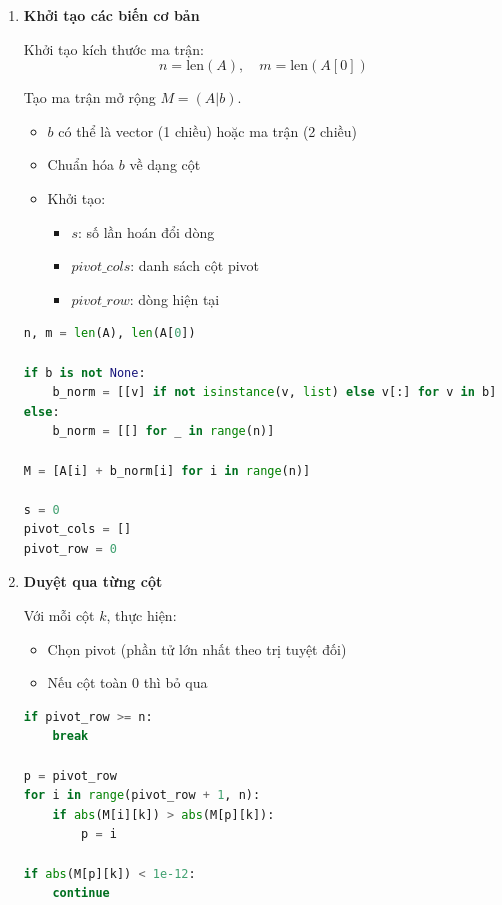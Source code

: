 \documentclass[a4paper,12pt]{report}
\begin{document}
\begin{enumerate}

\item \textbf{Khởi tạo các biến cơ bản}

Khởi tạo kích thước ma trận:
\[
n = \text{len}(A), \quad m = \text{len}(A[0])
\]

Tạo ma trận mở rộng $M = (A|b)$.

\begin{itemize}
    \item $b$ có thể là vector (1 chiều) hoặc ma trận (2 chiều)
    \item Chuẩn hóa $b$ về dạng cột
    \item Khởi tạo:
    \begin{itemize}
        \item $s$: số lần hoán đổi dòng
        \item $pivot\_cols$: danh sách cột pivot
        \item $pivot\_row$: dòng hiện tại
    \end{itemize}
\end{itemize}

\begin{lstlisting}[language=Python, caption={Khởi tạo dữ liệu}]
n, m = len(A), len(A[0])

if b is not None:
    b_norm = [[v] if not isinstance(v, list) else v[:] for v in b]
else:
    b_norm = [[] for _ in range(n)]

M = [A[i] + b_norm[i] for i in range(n)]

s = 0
pivot_cols = []
pivot_row = 0
\end{lstlisting}

\item \textbf{Duyệt qua từng cột}

Với mỗi cột $k$, thực hiện:

\begin{itemize}
    \item Chọn pivot (phần tử lớn nhất theo trị tuyệt đối)
    \item Nếu cột toàn 0 thì bỏ qua
\end{itemize}

\begin{lstlisting}[language=Python, caption={Chọn pivot}]
if pivot_row >= n:
    break

p = pivot_row
for i in range(pivot_row + 1, n):
    if abs(M[i][k]) > abs(M[p][k]):
        p = i

if abs(M[p][k]) < 1e-12:
    continue


\end{lstlisting}
\end{enumerate}
\end{document}
